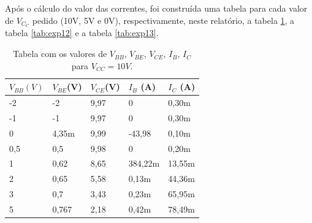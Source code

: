 \documentclass{abntex2}
\begin{document}
Após o cálculo do valor das correntes, foi construída uma tabela para cada valor de $V_C_C$ pedido
(10V, 5V e 0V), respectivamente, neste relatório, a tabela \ref{tab:exp11}, a tabela \ref{tab:exp12} e a tabela \ref{tab:exp13}.

\begin{table}[h]
\centering
\begin{tabular}{|l|l|l|l|l|}
\hline
$V_{BB}(V)$ & $V_{BE}$(V) & $V_{CE}$(V) & $I_B$ (A) & $I_C$ (A) \\
\hline
-2        & -2      & 9,97                              & 0             & 0,30m                  \\
\hline
-1         & -1      &  9,97                          & 0             & 0,30m                  \\
\hline
0           & 4,35m      & 9,99                           & -43,98             & 0,10m                  \\
\hline
0,5        & 0,5      & 9,98                           & 0             & 0,20m                  \\
\hline
1         & 0,62      & 8,65                           & 384,22m             & 13,55m                  \\
\hline
2         & 0,65      & 5,58                           & 0,13m             & 44,36m                  \\
\hline
3         & 0,7      & 3,43                          & 0,23m             & 65,95m                  \\
\hline
5         & 0,767      & 2,18                           & 0,42m             & 78,49m                  \\
\hline
\end{tabular}
\label{tab:exp11}
\caption{Tabela com os valores de $V_{BB}$, $V_{BE}$, $V_{CE}$, $I_B$, $I_C$ para $V_{CC} = 10V$.}
\end{table}
\end{document}
